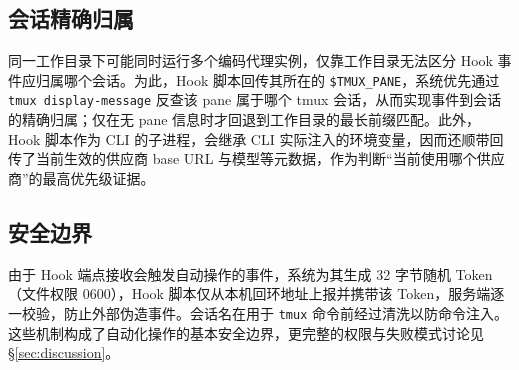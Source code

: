 \subsection{会话精确归属}
\label{sec:arch-attribution}

同一工作目录下可能同时运行多个编码代理实例，仅靠工作目录无法区分 Hook 事件应归属哪个会话。为此，Hook 脚本回传其所在的 \texttt{\$TMUX\_PANE}，系统优先通过 \texttt{tmux display-message} 反查该 pane 属于哪个 tmux 会话，从而实现事件到会话的精确归属；仅在无 pane 信息时才回退到工作目录的最长前缀匹配。此外，Hook 脚本作为 CLI 的子进程，会继承 CLI 实际注入的环境变量，因而还顺带回传了当前生效的供应商 base URL 与模型等元数据，作为判断“当前使用哪个供应商”的最高优先级证据。

\subsection{安全边界}
\label{sec:arch-security}

由于 Hook 端点接收会触发自动操作的事件，系统为其生成 32 字节随机 Token（文件权限 0600），Hook 脚本仅从本机回环地址上报并携带该 Token，服务端逐一校验，防止外部伪造事件。会话名在用于 \texttt{tmux} 命令前经过清洗以防命令注入。这些机制构成了自动化操作的基本安全边界，更完整的权限与失败模式讨论见 \S\ref{sec:discussion}。
